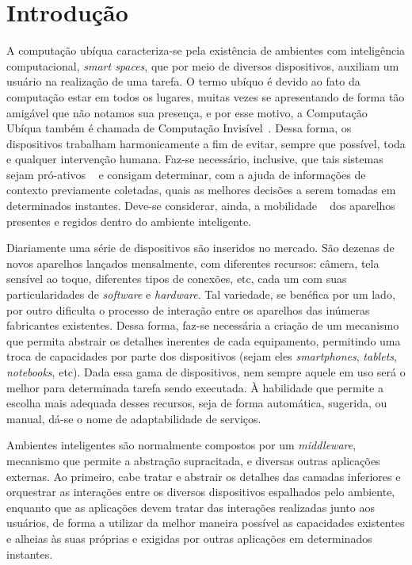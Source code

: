 \chapter{Introdução}

A computação ubíqua caracteriza-se pela existência de ambientes com inteligência computacional, \emph{smart spaces}, que por meio de diversos dispositivos, auxiliam um usuário na realização de uma tarefa. O termo ubíquo é devido ao fato da computação estar em todos os lugares, muitas vezes se apresentando de forma tão amigável que não notamos sua presença, e por esse motivo, a Computação Ubíqua também é chamada de Computação Invisível~\cite{gomes2007, weiser1993, weiser1999}. Dessa forma, os dispositivos trabalham harmonicamente a fim de evitar, sempre que possível, toda e qualquer intervenção humana. Faz-se necessário, inclusive, que tais sistemas sejam pró-ativos ~\cite{gomes2007, buzeto2010} e consigam determinar, com a ajuda de informações de contexto previamente coletadas, quais as melhores decisões a serem tomadas em determinados instantes. Deve-se considerar, ainda, a mobilidade ~\cite{gomes2007, buzeto2010, weiser1999} dos aparelhos presentes e regidos dentro do ambiente inteligente.

Diariamente uma série de dispositivos são inseridos no mercado. São dezenas de novos aparelhos lançados mensalmente, com diferentes recursos: câmera, tela sensível ao toque, diferentes tipos de conexões, etc, cada um com suas particularidades de \emph{software} e \emph{hardware}. Tal variedade, se benéfica por um lado, por outro dificulta o processo de interação entre os aparelhos das inúmeras fabricantes existentes. Dessa forma, faz-se necessária a criação de um mecanismo que permita abstrair os detalhes inerentes de cada equipamento, permitindo uma troca de capacidades por parte dos dispositivos (sejam eles \emph{smartphones}, \emph{tablets}, \emph{notebooks}, etc). Dada essa gama de dispositivos, nem sempre aquele em uso será o melhor para determinada tarefa sendo executada. À habilidade que permite a escolha mais adequada desses recursos, seja de forma automática, sugerida, ou manual, dá-se o nome de adaptabilidade de serviços.

Ambientes inteligentes são normalmente compostos por um \emph{middleware}, mecanismo que permite a abstração supracitada, e diversas outras aplicações externas. Ao primeiro, cabe tratar e abstrair os detalhes das camadas inferiores e orquestrar as interações entre os diversos dispositivos espalhados pelo ambiente, enquanto que as aplicações devem tratar das interações realizadas junto aos usuários, de forma a utilizar da melhor maneira possível as capacidades existentes e alheias às suas próprias e exigidas por outras aplicações em determinados instantes.

